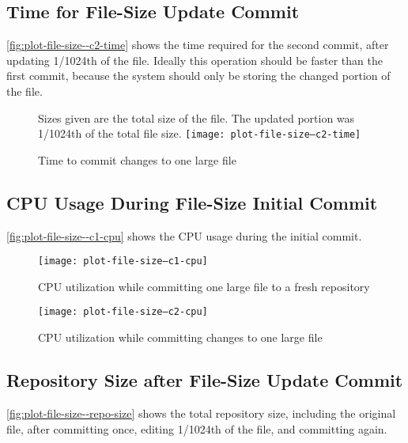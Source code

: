 \subsection{Time for File-Size Update Commit}

\autoref{fig:plot-file-size--c2-time} shows the time required for the second
commit, after updating \num{1/1024}th of the file. Ideally this operation should
be faster than the first commit, because the system should only be storing the
changed portion of the file.


\begin{figure}[]
    \caption{Time to commit changes to one large file}
    \label{fig:plot-file-size--c2-time}
    \centering
    Sizes given are the total size of the file. The updated portion was
    \num{1/1024}th of the total file size.
    \texttt{[image: plot-file-size--c2-time]}
\end{figure}


\subsection{CPU Usage During File-Size Initial Commit}

\autoref{fig:plot-file-size--c1-cpu} shows the
CPU usage during the initial commit.


\begin{figure}[]
  \caption{CPU utilization while committing one large file to a fresh repository}
  \label{fig:plot-file-size--c1-cpu}
  \centering
    \texttt{[image: plot-file-size--c1-cpu]}
\end{figure}


\begin{figure}[]
  \caption{CPU utilization while committing changes to one large file}
  \label{fig:plot-file-size--c2-cpu}
  \centering
    \texttt{[image: plot-file-size--c2-cpu]}
\end{figure}


\subsection{Repository Size after File-Size Update Commit}

\autoref{fig:plot-file-size--repo-size} shows the total
repository size, including the original file, after committing once, editing
1/1024th of the file, and committing again.

